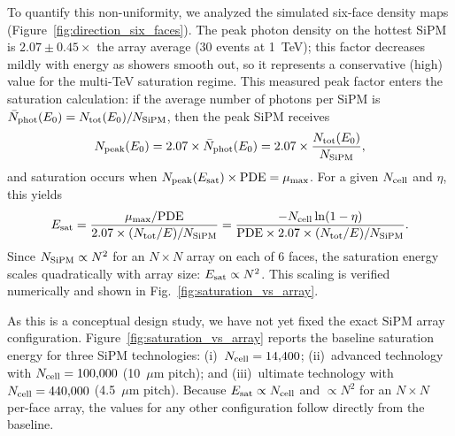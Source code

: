 \documentclass{aastex701}
\begin{document}
To quantify this non-uniformity, we analyzed the simulated six-face density maps (Figure~\ref{fig:direction_six_faces}). The peak photon density on the hottest SiPM is $2.07\pm 0.45\times$ the array average (30 events at 1~TeV); this factor decreases mildly with energy as showers smooth out, so it represents a conservative (high) value for the multi-TeV saturation regime. This measured peak factor enters the saturation calculation: if the average number of photons per SiPM is $\bar{N}_{\rm phot}(E_0) = N_{\rm tot}(E_0)/N_{\rm SiPM}$, then the peak SiPM receives
\begin{equation}
N_{\rm peak}(E_0) = 2.07 \times \bar{N}_{\rm phot}(E_0) = 2.07 \times \frac{N_{\rm tot}(E_0)}{N_{\rm SiPM}},
\end{equation}
and saturation occurs when $N_{\rm peak}(E_{\rm sat}) \times {\rm PDE} = \mu_{\max}$. For a given $N_{\rm cell}$ and $\eta$, this yields
\begin{equation}
E_{\rm sat} = \frac{\mu_{\max}/{\rm PDE}}{2.07 \times (N_{\rm tot}/E)/N_{\rm SiPM}} 
= \frac{-N_{\rm cell}\ln(1-\eta)}{{\rm PDE} \times 2.07 \times (N_{\rm tot}/E)/N_{\rm SiPM}}.
\end{equation}
Since $N_{\rm SiPM} \propto N^2$ for an $N\times N$ array on each of 6 faces, the saturation energy scales quadratically with array size: $E_{\rm sat} \propto N^2$. This scaling is verified numerically and shown in Fig.~\ref{fig:saturation_vs_array}.

As this is a conceptual design study, we have not yet fixed the exact SiPM array configuration. Figure~\ref{fig:saturation_vs_array} reports the baseline saturation energy for three SiPM technologies: (i)~$N_{\rm cell} = 14{,}400$; (ii)~advanced technology with $N_{\rm cell} = 100{,}000$ (10~$\mu$m pitch); and (iii)~ultimate technology with $N_{\rm cell} = 440{,}000$ (4.5~$\mu$m pitch). Because $E_{\rm sat} \propto N_{\rm cell}$ and $\propto N^2$ for an $N\times N$ per-face array, the values for any other configuration follow directly from the baseline.
\end{document}

